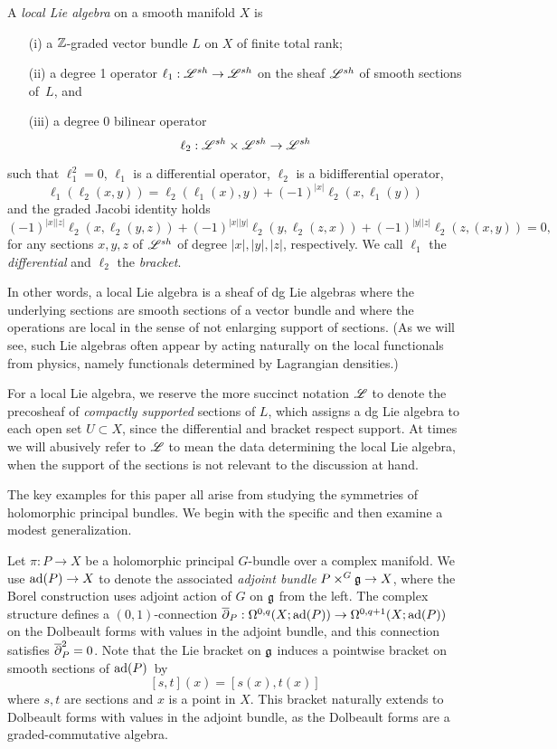 \begin{dfn} 
A {\em local Lie algebra} on a smooth manifold $X$ is 
\begin{itemize}
\item[(i)] a $\mathbb Z$-graded vector bundle $L$ on $X$ of finite total rank;
\item[(ii)] a degree 1 operator $\ell_1:\mathscr L^{sh} \to \mathscr L^{sh}$ on the sheaf $\mathscr L^{sh}$ of smooth sections of~$L$, and
\item[(iii)] a degree 0 bilinear operator
\[
\ell_2 : \mathscr L^{sh} \times \mathscr L^{sh} \to \mathscr L^{sh}
\]
\end{itemize}
such that $\ell_1^2 = 0$, $\ell_1$ is a differential operator, $\ell_2$ is a bidifferential operator,
\[
\ell_1(\ell_2(x,y)) = \ell_2(\ell_1(x), y) + (-1)^{|x|} \ell_2(x, \ell_1(y))
\]
and the graded Jacobi identity holds
\[
(-1)^{|x||z|} \ell_2(x,\ell_2(y,z)) + (-1)^{|x||y|} \ell_2(y, \ell_2(z,x)) + (-1)^{|y||z|} \ell_2(z,(x,y)) = 0,
\]
for any sections $x,y,z$ of $\mathscr L^{sh}$ of degree $|x|, |y|, |z|$, respectively. 
We call $\ell_1$ the {\em differential} and $\ell_2$ the {\em bracket}.
\end{dfn}

In other words, a local Lie algebra is a sheaf of dg Lie algebras 
where the underlying sections are smooth sections of a vector bundle and 
where the operations are local in the sense of not enlarging support of sections. 
(As we will see, such Lie algebras often appear by acting naturally on the local functionals from physics, namely functionals determined by Lagrangian densities.)

\begin{rmk}
For a local Lie algebra, we reserve the more succinct notation $\mathscr L$ to denote the precosheaf of {\em compactly supported} sections of $L$,
which assigns a dg Lie algebra to each open set $U \subset X$, 
since the differential and bracket respect support.
At times we will abusively refer to $\mathscr L$ to mean the data determining the local Lie algebra,
when the support of the sections is not relevant to the discussion at hand.
\end{rmk}

The key examples for this paper all arise from studying the symmetries of holomorphic principal bundles.
We begin with the specific and then examine a modest generalization.

Let $\pi : P \to X$ be a holomorphic principal $G$-bundle over a complex manifold.
We use ${\rm ad}(P) \to X$ to denote the associated {\em adjoint bundle} $P \times^{G} \mathfrak g \to X$, 
where the Borel construction uses adjoint action of $G$ on $\mathfrak g$ from the left. 
The complex structure defines a $(0,1)$-connection $\overline{\partial}_P : \Omega^{0,q}(X ; {\rm ad}(P)) \to \Omega^{0,q+1}(X ; {\rm ad}(P))$
on the Dolbeault forms with values in the adjoint bundle,
and this connection satisfies $\overline{\partial}_P^2 = 0$.
Note that the Lie bracket on $\mathfrak g$ induces a pointwise bracket on smooth sections of ${\rm ad}(P)$~by
\[
[s,t](x) = [s(x),t(x)]
\]
where $s, t$ are sections and $x$ is a point in $X$.
This bracket naturally extends to Dolbeault forms with values in the adjoint bundle,
as the Dolbeault forms are a graded-commutative algebra.

